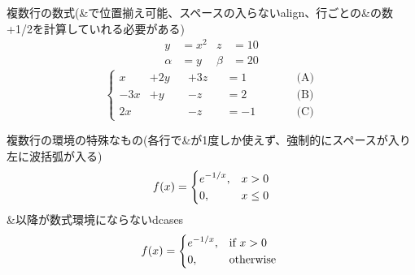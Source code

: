 \documentclass[uplatex, 11pt, a4j, dvipdfmx]{jsarticle}
\begin{document}
      複数行の数式(\&で位置揃え可能、スペースの入らないalign、行ごとの\&の数+1/2を計算していれる必要がある)
      \begin{equation}\begin{alignedat}{2}
        y      &= x^2 & z     &= 10 \\
        \alpha &= y   & \beta &=20
      \end{alignedat}\end{equation}
      \begin{equation}
        \left\{
        \begin{alignedat}{4}
            x &+2y & &+3z & &= 1   &        & \text{(A)} \\
          -3x &+ y & &- z & &= 2   &        & \text{(B)} \\
           2x &    & &- z & &= -1  & \qquad & \text{(C)}
        \end{alignedat}
        \right.
      \end{equation}

      複数行の環境の特殊なもの(各行で\&が1度しか使えず、強制的にスペースが入り左に波括弧が入る)
      \begin{equation}
        f(x) =
        \begin{dcases}
          e^{-1/x}, & x > 0 \\
          0,        & x \le 0
        \end{dcases}
      \end{equation}
      \&以降が数式環境にならないdcases
      \begin{equation}
        f(x) =
        \begin{dcases*}
          e^{-1/x}, & if $x>0$ \\
          0,        & otherwise
        \end{dcases*}
      \end{equation}
\end{document}
